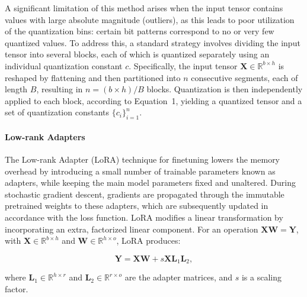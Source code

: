 A significant limitation of this method arises when the input tensor contains values with large absolute magnitude (outliers), as this leads to poor utilization of the quantization bins: certain bit patterns correspond to no or very few quantized values. To address this, a standard strategy involves dividing the input tensor into several blocks, each of which is quantized separately using an individual quantization constant $c$. Specifically, the input tensor $\mathbf{X}\in \mathbb{R}^{b\times h}$ is reshaped by flattening and then partitioned into $n$ consecutive segments, each of length $B$, resulting in ${n = ({b\times h})/{B}}$ blocks. Quantization is then independently applied to each block, according to Equation~1, yielding a quantized tensor and a set of quantization constants $\{c_i\}_{i=1}^n$.

\paragraph{Low-rank Adapters} The Low-rank Adapter (LoRA) technique for finetuning \citep{hu2021lora} lowers the memory overhead by introducing a small number of trainable parameters known as adapters, while keeping the main model parameters fixed and unaltered. During stochastic gradient descent, gradients are propagated through the immutable pretrained weights to these adapters, which are subsequently updated in accordance with the loss function. LoRA modifies a linear transformation by incorporating an extra, factorized linear component. For an operation ${\mathbf{X} \mathbf{W} = \mathbf{Y}}$, with $\mathbf{X}\in  \mathbb{R}^{b\times h}$ and $\mathbf{W}\in  \mathbb{R}^{h\times o}$, LoRA produces:

\begin{equation}
    \mathbf{Y} = \mathbf{X}\mathbf{W} + s\mathbf{X}\mathbf{L}_1\mathbf{L}_2,
\end{equation}

where $\mathbf{L}_1\in  \mathbb{R}^{h\times r}$ and $\mathbf{L}_2\in  \mathbb{R}^{r\times o}$ are the adapter matrices, and $s$ is a scaling factor.

